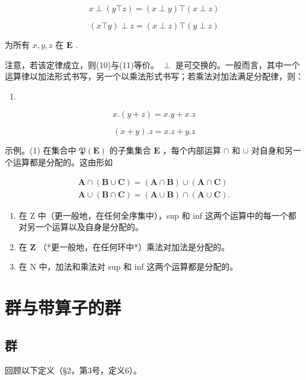 \[
x \perp (y \top z) = (x \perp y) \top (x \perp z)\tag{11}
\]

\[
(x \top y) \perp z = (x \perp z) \top (y \perp z)
\]

为所有 \(x, y, z\) 在 \(\mathbf{E}\) .

注意，若该定律成立，则(10)与(11)等价。 \(\perp\) 是可交换的。一般而言，其中一个运算律以加法形式书写，另一个以乘法形式书写；若乘法对加法满足分配律，则：

\begin{enumerate}
\def\labelenumi{(\arabic{enumi})}
\setcounter{enumi}{11}
\tightlist
\item
\end{enumerate}

\[
x. (y + z) = x. y + x. z\tag{13}
\]

\[
(x + y). z = x. z + y. z
\]

示例。(1) 在集合中 \(\mathfrak{P}(\mathbf{E})\) 的子集集合 \(\mathbf{E}\) ，每个内部运算 \(\cap\) 和 \(\cup\) 对自身和另一个运算都是分配的。这由形如

\[
\begin{array}{l} \mathbf {A} \cap (\mathbf {B} \cup \mathbf {C}) = (\mathbf {A} \cap \mathbf {B}) \cup (\mathbf {A} \cap \mathbf {C}) \\ \mathbf {A} \cup (\mathbf {B} \cap \mathbf {C}) = (\mathbf {A} \cup \mathbf {B}) \cap (\mathbf {A} \cup \mathbf {C}). \end{array}
\]

\begin{enumerate}
\def\labelenumi{(\arabic{enumi})}
\setcounter{enumi}{1}
\item
  在 Z 中（更一般地，在任何全序集中），sup 和 inf 这两个运算中的每一个都对另一个运算以及自身是分配的。
\item
  在 \(\mathbf{Z}\) （*更一般地，在任何环中*）乘法对加法是分配的。
\item
  在 N 中，加法和乘法对 sup 和 inf 这两个运算都是分配的。
\end{enumerate}

\section{群与带算子的群}

\subsection{群}

回顾以下定义（§2，第3号，定义6）。

